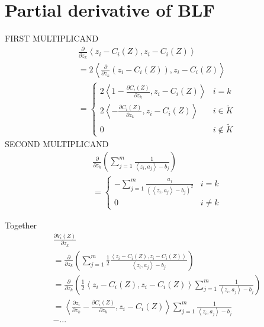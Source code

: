 \documentclass[journal]{IEEEtran}
\newcommand{\twopartdef}[4]
{
	\left\{
	\begin{array}{ll}
		#1 & #2 \\
		#3 & #4
	\end{array}
	\right.
}
\newcommand{\threepartdef}[6]
{
	\left\{
	\begin{array}{ll}
		#1 & #2 \\
		#3 & #4 \\
		#5 & #6 
	\end{array}
	\right.
}
\begin{document}
\section{Partial derivative of BLF}

FIRST MULTIPLICAND
\begin{equation} \label{eqn:distance_der}
\begin{split}
& \frac{\partial}{\partial z_k} \left< z_i - C_i(Z), z_i - C_i(Z)\right>  \\
& = 2 \left<\frac{\partial}{\partial z_k} (z_i - C_i(Z)), z_i - C_i(Z)\right> \\
& = \threepartdef 	{2 \left<1 - \frac{\partial C_i(Z)}{\partial z_k}, z_i - C_i(Z)\right>}				{i = k}	
					{2 \left<- \frac{\partial C_i(Z)}{\partial z_k}, z_i - C_i(Z)\right>}					{i \in \tilde{K}}
					{0}																					{i \notin \tilde{K}}
\end{split}
\end{equation}
SECOND MULTIPLICAND
\begin{equation} \label{eqn:guard_doc}
\begin{split}
& \frac{\partial}{\partial z_k} \left ( \sum^{m}_{j=1} \frac{1}{\left<z_i, a_j \right> - b_j} \right)  \\
& = \twopartdef 	{- \sum^{m}_{j=1} \frac{a_j}{\left (\left<z_i, a_j \right> - b_j \right )^2} }		{i = k}	
					{0}																					{i \neq k}
\end{split}
\end{equation}


Together
\begin{equation} \label{eqn:Vk_dot_implementation}
\begin{split}
& \frac{\partial V_i(Z)}{\partial z_k} \\
& = \frac{\partial}{\partial z_k} \left ( \sum^{m}_{j=1} \frac{1}{2} \frac{\left< z_i - C_i(Z), z_i - C_i(Z)\right>}{\left<z_i, a_j \right> - b_j} \right) \\ %
& = \frac{\partial}{\partial z_k} \left (\frac{1}{2} \left< z_i - C_i(Z), z_i - C_i(Z)\right> \sum^{m}_{j=1} \frac{1}{\left<z_i, a_j \right> - b_j} \right) \\
& = \left < \frac{\partial z_i}{\partial z_k} - \frac{\partial C_i(Z)}{\partial z_k},   z_i - C_i(Z) \right > \sum^{m}_{j=1} \frac{1}{\left<z_i, a_j \right> - b_j} \\
& - ...
\end{split}
\end{equation}
\end{document}
